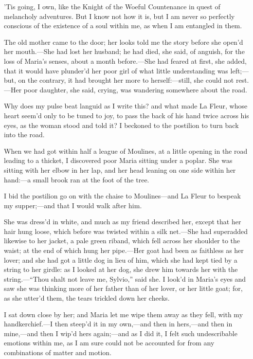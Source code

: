 \documentclass[twoside]{article}
\begin{document}
’Tis going, I own, like the Knight of the Woeful Countenance in quest of
melancholy adventures.  But I know not how it is, but I am never so
perfectly conscious of the existence of a soul within me, as when I am
entangled in them.

The old mother came to the door; her looks told me the story before she
open’d her mouth.—She had lost her husband; he had died, she said, of
anguish, for the loss of Maria’s senses, about a month before.—She had
feared at first, she added, that it would have plunder’d her poor girl of
what little understanding was left;—but, on the contrary, it had brought
her more to herself:—still, she could not rest.—Her poor daughter, she
said, crying, was wandering somewhere about the road.

Why does my pulse beat languid as I write this? and what made La Fleur,
whose heart seem’d only to be tuned to joy, to pass the back of his hand
twice across his eyes, as the woman stood and told it?  I beckoned to the
postilion to turn back into the road.

When we had got within half a league of Moulines, at a little opening in
the road leading to a thicket, I discovered poor Maria sitting under a
poplar.  She was sitting with her elbow in her lap, and her head leaning
on one side within her hand:—a small brook ran at the foot of the tree.

I bid the postilion go on with the chaise to Moulines—and La Fleur to
bespeak my supper;—and that I would walk after him.

She was dress’d in white, and much as my friend described her, except
that her hair hung loose, which before was twisted within a silk net.—She
had superadded likewise to her jacket, a pale green riband, which fell
across her shoulder to the waist; at the end of which hung her pipe.—Her
goat had been as faithless as her lover; and she had got a little dog in
lieu of him, which she had kept tied by a string to her girdle: as I
looked at her dog, she drew him towards her with the string.—“Thou shalt
not leave me, Sylvio,” said she.  I look’d in Maria’s eyes and saw she
was thinking more of her father than of her lover, or her little goat;
for, as she utter’d them, the tears trickled down her cheeks.

I sat down close by her; and Maria let me wipe them away as they fell,
with my handkerchief.—I then steep’d it in my own,—and then in hers,—and
then in mine,—and then I wip’d hers again;—and as I did it, I felt such
undescribable emotions within me, as I am sure could not be accounted for
from any combinations of matter and motion.
\end{document}
